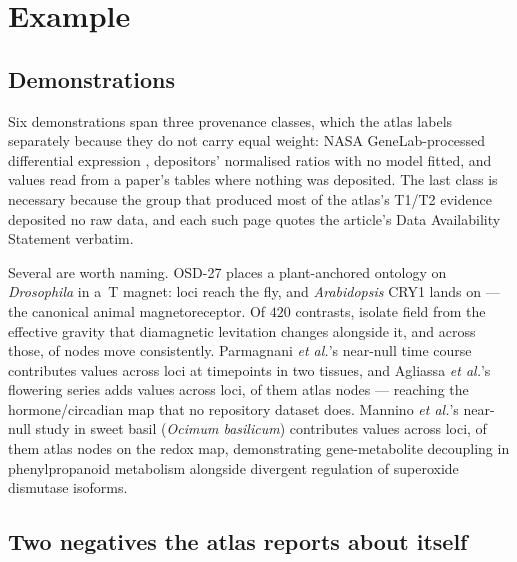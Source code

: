 \documentclass[11pt,a4paper]{article}
\begin{document}
\section{Example}

\subsection{Demonstrations}

Six demonstrations span three provenance classes, which the atlas labels separately
because they do not carry equal weight: NASA GeneLab-processed differential expression
\citep{Berrios2021}, depositors' normalised ratios with no model fitted, and values read
from a paper's tables where nothing was deposited. The last class is necessary because
the group that produced most of the atlas's T1/T2 evidence deposited no raw data, and
each such page quotes the article's Data Availability Statement verbatim.

Several are worth naming. OSD-27 places a plant-anchored ontology on \emph{Drosophila} in a
\OsdTwentySevenTesla\,T magnet: \OsdTwentySevenOrth{} loci reach the fly, and
\emph{Arabidopsis} CRY1 lands on \texttt{\CryFly} --- the canonical animal
magnetoreceptor. Of $420$ contrasts, \OsdTwentySevenContrasts{} isolate field from the
effective gravity that diamagnetic levitation changes alongside it, and across those,
\OsdTwentySevenConsistent{} of \OsdTwentySevenNodes{} nodes move consistently. Parmagnani \emph{et al.}'s near-null time course \citep{Parmagnani2022} contributes
\ParmCells{} values across \ParmLoci{} loci at \ParmTimepoints{} timepoints in two
tissues, and Agliassa \emph{et al.}'s flowering series \citep{Agliassa2018a} adds
\AglCells{} values across \AglLoci{} loci, \AglQbo{} of them atlas nodes --- reaching
the hormone/circadian map that no repository dataset does. Mannino \emph{et al.}'s
near-null study in sweet basil (\emph{Ocimum basilicum}) \citep{Mannino2026}
contributes \ManninoCells{} values across \ManninoLoci{} loci, \ManninoQbo{} of them
atlas nodes on the redox map, demonstrating gene-metabolite decoupling in
phenylpropanoid metabolism alongside divergent regulation of superoxide dismutase
isoforms.

\subsection{Two negatives the atlas reports about itself}
\end{document}
